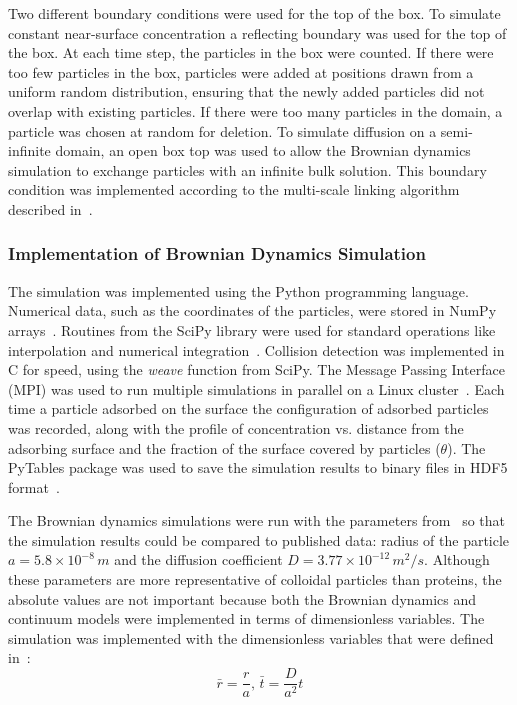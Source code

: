 Two different boundary conditions were used for the top of the box.
To simulate constant near-surface concentration a reflecting boundary
was used for the top of the box. At each time step, the particles
in the box were counted. If there were too few particles in the box,
particles were added at positions drawn from a uniform random distribution,
ensuring that the newly added particles did not overlap with existing
particles. If there were too many particles in the domain, a particle
was chosen at random for deletion. To simulate diffusion on a semi-infinite
domain, an open box top was used to allow the Brownian dynamics simulation
to exchange particles with an infinite bulk solution. This boundary
condition was implemented according to the multi-scale linking algorithm
described in~\cite{Magan2004}. 


\subsubsection{Implementation of Brownian Dynamics Simulation}

The simulation was implemented using the Python programming language.
Numerical data, such as the coordinates of the particles, were stored
in NumPy arrays~\cite{Oliphant2006}. Routines from the SciPy library
were used for standard operations like interpolation and numerical
integration~\cite{Oliphant2007}. Collision detection was implemented
in C for speed, using the \emph{weave} function from SciPy. The Message
Passing Interface (MPI) was used to run multiple simulations in parallel
on a Linux cluster~\cite{MPI}. Each time a particle adsorbed on
the surface the configuration of adsorbed particles was recorded,
along with the profile of concentration vs. distance from the adsorbing
surface and the fraction of the surface covered by particles ($\theta$).
The PyTables package was used to save the simulation results to binary
files in HDF5 format~\cite{Alted2002-,HDFGroup2000-}. 

The Brownian dynamics simulations were run with the parameters from~\cite{Magan2004}
so that the simulation results could be compared to published data:
radius of the particle $a=5.8\times10^{-8}\, m$ and the diffusion
coefficient $D=3.77\times10^{-12}\, m^{2}/s$. Although these parameters
are more representative of colloidal particles than proteins, the
absolute values are not important because both the Brownian dynamics
and continuum models were implemented in terms of dimensionless variables.
The simulation was implemented with the dimensionless variables that
were defined in~\cite{Magan2004}:\begin{equation}
\bar{r}=\frac{r}{a},\,\bar{t}=\frac{D}{a^{2}}t\label{eq:Dimensionless variables}\end{equation}



